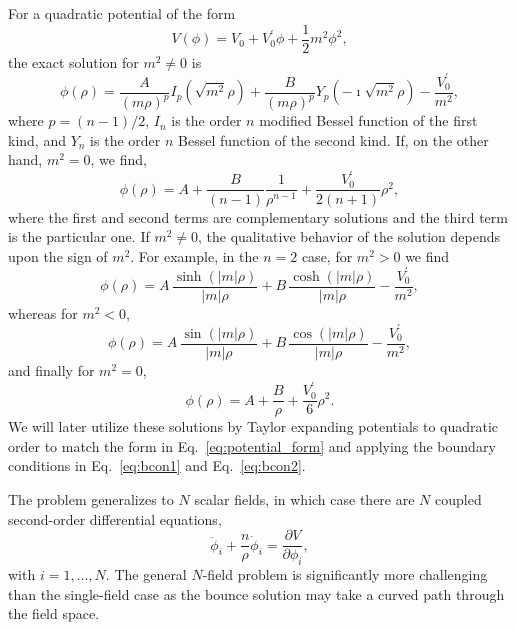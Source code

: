 \documentclass[final,3p,11pt,pdflatex]{elsarticle}
\renewcommand{\tfrac}{\frac}
\renewcommand{\refeq}[1]{Eq.~\ref{#1}}
\begin{document}
For a quadratic potential of the form
\begin{equation}\label{eq:potential_form}
V(\phi) = V^{\phantom\prime}_0 + V^\prime_0 \phi + \tfrac{1}{2} m^2 \phi^2,
\end{equation}
the exact solution for $m^2 \neq 0$ is
\begin{equation}\label{eq:sol}
\phi(\rho) =  \frac{A}{(m \rho)^p} I_p\left(\sqrt{m^2} \rho\right) + \frac{B}{(m \rho)^p} Y_p \left(-\imath \sqrt{m^2} \rho\right) -\frac{V^\prime_0}{m^2},
\end{equation}
where $p = (n-1)/2$, $I_n$ is the order $n$ modified Bessel function of the first kind, and $Y_n$ is the order $n$ Bessel function of the second kind.  If, on the other hand, $m^2 = 0$, we find,
\begin{equation}
\phi(\rho) = A + \frac{B}{(n-1)} \frac{1}{\rho^{n - 1}}+ \frac{V^\prime_0}{2 (n + 1)} \rho^2 ,
\end{equation}
where the first and second terms are complementary solutions and the third term is the particular one.  If $m^2 \neq 0$, the qualitative behavior of the solution depends upon the sign of $m^2$.  For example, in the $n=2$ case, for $m^2 > 0$ we find
\begin{equation}\label{eq:gt}
\phi(\rho) = A\, \frac{\sinh\left(|m| \rho\right)}{|m|\rho} + B\, \frac{\cosh\left(|m| \rho\right)}{|m|\rho} - \frac{V^\prime_0}{m^2},
\end{equation}
whereas for $m^2 < 0$,
\begin{equation}\label{eq:lt}
\phi(\rho) = A\, \frac{\sin\left(|m| \rho\right)}{|m| \rho} + B\, \frac{\cos\left(|m| \rho\right)}{|m| \rho} - \frac{V^\prime_0}{m^2},
\end{equation}
and finally for $m^2 = 0$,
\begin{equation}\label{eq:zero}
\phi(\rho) = A + \frac{B}{\rho} + \frac{V^\prime_0}{6} \rho^2.
\end{equation}
We will later utilize these solutions by Taylor expanding potentials to quadratic order to match the form in \refeq{eq:potential_form} and applying the boundary conditions in \refeq{eq:bcon1} and \refeq{eq:bcon2}.

The problem generalizes to $N$ scalar fields, in which case there are $N$
coupled second-order differential equations,
\begin{equation}\label{eq:n_dim_bounce}
\ddot \phi_i + \tfrac{n}{\rho}\dot\phi_i = \frac{\partial V}{\partial \phi_i},
\end{equation}
with $i=1,\ldots, N$.  The general $N$-field problem is significantly more challenging than the single-field case as the bounce solution may take a curved path through the field space.
\end{document}
